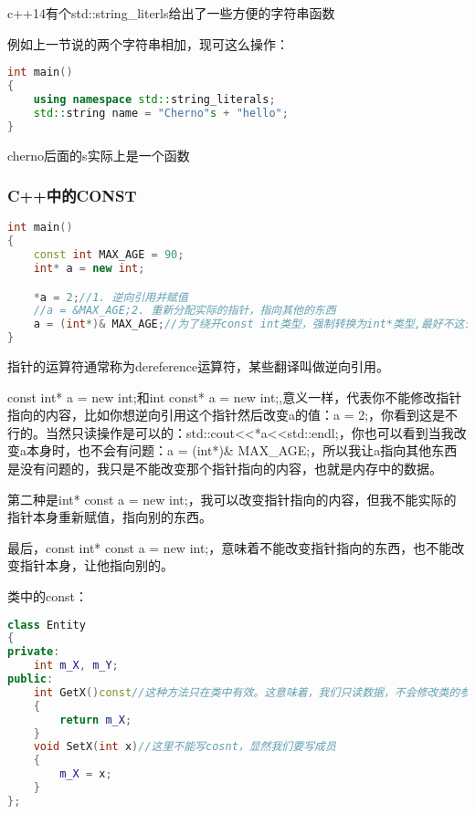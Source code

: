c++14有个{\ncodestyle std::string_literls}给出了一些方便的字符串函数

例如上一节说的两个字符串相加，现可这么操作：

\begin{lstlisting}[language=c++]
int main()
{
    using namespace std::string_literals;
    std::string name = "Cherno"s + "hello";
}
\end{lstlisting}

{\ncodestyle cherno}后面的{\ncodestyle s}实际上是一个函数

\subsubsection{C++中的CONST}

\begin{lstlisting}[language=c++]
int main()
{
    const int MAX_AGE = 90;
    int* a = new int;

    *a = 2;//1. 逆向引用并赋值
    //a = &MAX_AGE;2. 重新分配实际的指针，指向其他的东西
    a = (int*)& MAX_AGE;//为了绕开const int类型，强制转换为int*类型,最好不这么做
}
\end{lstlisting}


指针的{\ncodestyle *}运算符通常称为{\ncodestyle dereference}运算符，某些翻译叫做逆向引用。

{\ncodestyle const int* a = new int;}和{\ncodestyle int const* a = new int;},意义一样，代表你不能修改指针指向的内容，比如你想逆向引用这个指针然后改变{\ncodestyle a}的值：{\ncodestyle *a = 2;}，你看到这是不行的。当然只读操作是可以的：{\ncodestyle std::cout<<*a<<std::endl;}，你也可以看到当我改变{\ncodestyle a}本身时，也不会有问题：{\ncodestyle a = (int*)\& MAX_AGE;}，所以我让{\ncodestyle a}指向其他东西是没有问题的，我只是不能改变那个指针指向的内容，也就是内存中的数据。

第二种是{\ncodestyle int* const a = new int;}，我可以改变指针指向的内容，但我不能实际的指针本身重新赋值，指向别的东西。

最后，{\ncodestyle const int* const a = new int;}，意味着不能改变指针指向的东西，也不能改变指针本身，让他指向别的。


类中的{\ncodestyle const}：

\begin{lstlisting}[language=c++]
class Entity
{
private:
    int m_X, m_Y;
public:
    int GetX()const//这种方法只在类中有效。这意味着，我们只读数据，不会修改类的参数，所以在get函数后写const是有意义的(make sense)
    {
        return m_X;
    }
    void SetX(int x)//这里不能写cosnt，显然我们要写成员
    {
        m_X = x;
    }
};
\end{lstlisting}


